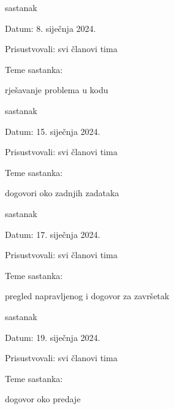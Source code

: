 \begin{packed_enum}
			\item  sastanak
			\item[] \begin{packed_item}
				\item Datum: 8. siječnja 2024.
				\item Prisustvovali: svi članovi tima
				\item Teme sastanka:
				\begin{packed_item}
					\item rješavanje problema u kodu
				\end{packed_item}
			\end{packed_item}
			
			\item  sastanak
			\item[] \begin{packed_item}
				\item Datum: 15. siječnja 2024.
				\item Prisustvovali: svi članovi tima
				\item Teme sastanka:
				\begin{packed_item}
					\item dogovori oko zadnjih zadataka
				\end{packed_item}
			\end{packed_item}
			
			\item  sastanak
			\item[] \begin{packed_item}
				\item Datum: 17. siječnja 2024.
				\item Prisustvovali: svi članovi tima
				\item Teme sastanka:
				\begin{packed_item}
					\item pregled napravljenog i dogovor za završetak
				\end{packed_item}
			\end{packed_item}
			
			\item  sastanak
			\item[] \begin{packed_item}
				\item Datum: 19. siječnja 2024.
				\item Prisustvovali: svi članovi tima
				\item Teme sastanka:
				\begin{packed_item}
					\item dogovor oko predaje
				\end{packed_item}
			\end{packed_item}
			
			
		\end{packed_enum}
		
